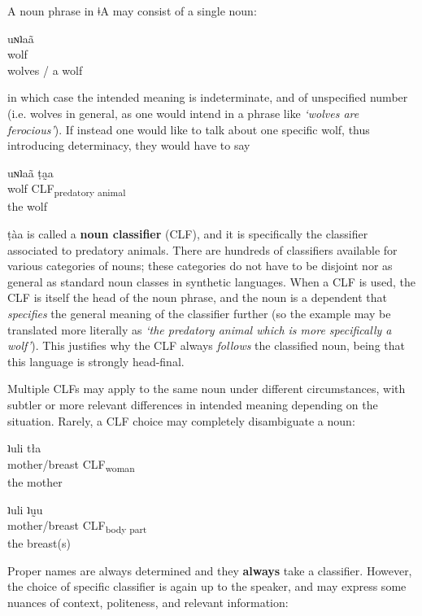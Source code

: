 \documentclass[11pt,a5paper]{book}
\newcommand{\qcn}[1]{\textcolor{AccentText}{\large#1}}
\newcommand{\langname}{\qcn{ǂA}}
\newcommand{\grammsc}[1]{\textsc{#1}}
\newcommand{\CLF}[1]{\grammsc{CLF}\textsubscript{#1}}
\begin{document}
A noun phrase in \langname{} may consist of a single noun:

\begin{exe}
\ex
\gll uɴʇaã\\
wolf\\
\glt wolves / a wolf
\end{exe}

in which case the intended meaning is indeterminate, and of unspecified number (i.e. wolves in general, as one would intend in a phrase like \emph{`wolves are ferocious'}). If instead one would like to talk about one specific wolf, thus introducing determinacy, they would have to say

\begin{exe}
\ex
\gll uɴʇaã ṭa̰a\\
wolf \CLF{predatory animal}\\
\glt the wolf
\end{exe}

\qcn{ṭàa} is called a \textbf{noun classifier} (CLF), and it is specifically the classifier associated to predatory animals. There are hundreds of classifiers available for various categories of nouns; these categories do not have to be disjoint nor as general as standard noun classes in synthetic languages. When a CLF is used, the CLF is itself the head of the noun phrase, and the noun is a dependent that \emph{specifies} the general meaning of the classifier further (so the example may be translated more literally as \emph{`the predatory animal which is more specifically a wolf'}). This justifies why the CLF always \emph{follows} the classified noun, being that this language is strongly head-final.

Multiple CLFs may apply to the same noun under different circumstances, with subtler or more relevant differences in intended meaning depending on the situation. Rarely, a CLF choice may completely disambiguate a noun:

\begin{exe}
\ex
\gll ʇuli tła\\
mother/breast \CLF{woman}\\
\glt the mother
\end{exe}

\begin{exe}
\ex
\gll ʇuli ʇṵu\\
mother/breast \CLF{body part}\\
\glt the breast(s)
\end{exe}

Proper names are always determined and they \textbf{always} take a classifier. However, the choice of specific classifier is again up to the speaker, and may express some nuances of context, politeness, and relevant information:
\end{document}
